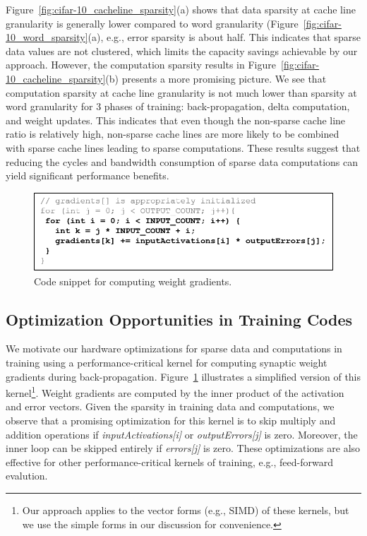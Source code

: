 Figure~\ref{fig:cifar-10_cacheline_sparsity}(a) shows that data sparsity at cache line granularity is generally lower compared to word granularity (Figure~\ref{fig:cifar-10_word_sparsity}(a), e.g., error sparsity is about half.  This indicates that sparse data values are not clustered, which limits the capacity savings achievable by our approach.  However, the computation sparsity results in Figure~\ref{fig:cifar-10_cacheline_sparsity}(b) presents a more promising picture. We see that computation sparsity at cache line granularity is not much lower than sparsity at word granularity for $3$ phases of training: back-propagation, delta computation, and weight updates. This indicates that even though the non-sparse cache line ratio is relatively high, non-sparse cache lines are more likely to be combined with sparse cache lines leading to sparse computations. These results suggest that reducing the cycles and bandwidth consumption of sparse data computations can yield significant performance benefits. 

\begin{figure}
 \centering
 \includegraphics[width=.9\columnwidth]{Figures/gradient_source_code.png}
\caption{Code snippet for computing weight gradients.}
 \label{fig:gradient_source_code}
 \end{figure}

\subsection{Optimization Opportunities in Training Codes}

We motivate our hardware optimizations for sparse data and computations in training using a performance-critical kernel for computing synaptic weight gradients during back-propagation.  Figure~\ref{fig:gradient_source_code} illustrates a simplified version of this kernel\footnote{Our approach applies to the vector forms (e.g., SIMD) of these kernels, but we use the simple forms in our discussion for convenience.}.   Weight gradients are computed by the inner product of the activation and error vectors.  Given the sparsity in training data and computations, we observe that a promising optimization for this kernel is to skip multiply and addition operations if \emph{inputActivations[i]} or \emph{outputErrors[j]} is zero.  Moreover, the inner loop can be skipped entirely if \emph{errors[j]} is zero.  These optimizations are also effective for other performance-critical kernels of training, e.g., feed-forward evalution. 

